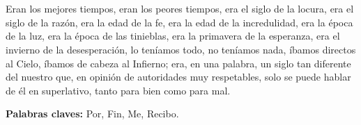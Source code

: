 \chapter*{\runtitulo}

\noindent
Eran los mejores tiempos, eran los peores tiempos, era el siglo de la locura, era el siglo de la razón, era la edad de la fe, era la edad de la incredulidad, era la época de la luz, era la época de las tinieblas, era la primavera de la esperanza, era el invierno de la desesperación, lo teníamos todo, no teníamos nada, íbamos directos al Cielo, íbamos de cabeza al Infierno; era, en una palabra, un siglo tan diferente del nuestro que, en opinión de autoridades muy respetables, solo se puede hablar de él en superlativo, tanto para bien como para mal.
\bigskip

\noindent\textbf{Palabras claves:} Por, Fin, Me, Recibo.
